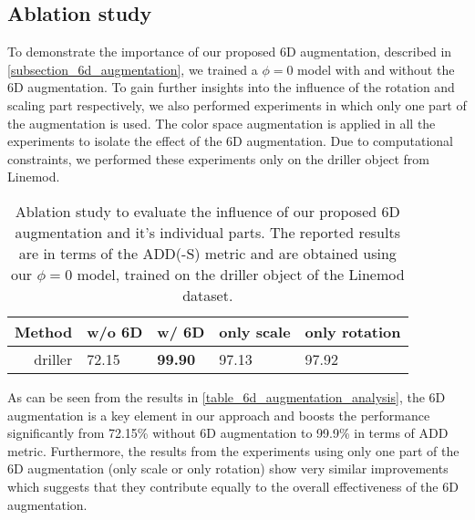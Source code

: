 \documentclass[twocolumn, 10pt, letterpaper]{article}
\begin{document}
\subsection{Ablation study}
\label{subsection_ablation_study}
To demonstrate the importance of our proposed 6D augmentation, described in \autoref{subsection_6d_augmentation}, we trained a $\phi = 0$ model with and without the 6D augmentation. To gain further insights into the influence of the rotation and scaling part respectively, we also performed experiments in which only one part of the augmentation is used. The color space augmentation is applied in all the experiments to isolate the effect of the 6D augmentation. Due to computational constraints, we performed these experiments only on the driller object from Linemod.\\
\begin{table}
\begin{tabularx}{\columnwidth}{ | r | X  X  X  X |}
 \hline
 Method & w/o 6D & w/ 6D & only scale & only rotation \\
 \hline
 driller & 72.15 & \textbf{99.90} & 97.13 & 97.92 \\
 \hline
\end{tabularx}
\caption{Ablation study to evaluate the influence of our proposed 6D augmentation and it's individual parts. The reported results are in terms of the ADD(-S) metric and are obtained using our $\phi = 0$ model, trained on the driller object of the Linemod dataset.}
\label{table_6d_augmentation_analysis}
\end{table}
 As can be seen from the results in \autoref{table_6d_augmentation_analysis}, the 6D augmentation is a key element in our approach and boosts the performance significantly from 72.15\% without 6D augmentation to 99.9\% in terms of ADD metric. Furthermore, the results from the experiments using only one part of the 6D augmentation (only scale or only rotation) show very similar improvements which suggests that they contribute equally to the overall effectiveness of the 6D augmentation.
\end{document}
